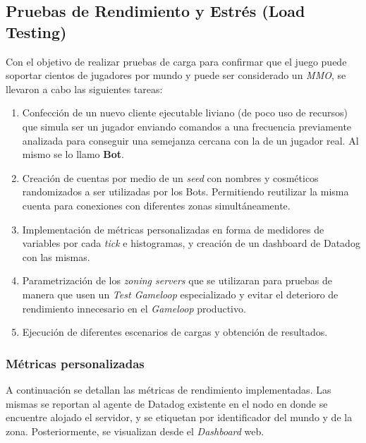 \subsection{Pruebas de Rendimiento y Estrés (Load Testing)}
\label{sec:load-test}

Con el objetivo de realizar pruebas de carga para confirmar que el juego puede soportar cientos de jugadores por mundo
y puede ser considerado un \textit{MMO}, se llevaron a cabo las siguientes tareas:

\begin{enumerate}
    \item Confección de un nuevo cliente ejecutable liviano (de poco uso de recursos) que simula ser un jugador
    enviando comandos a una frecuencia previamente analizada para conseguir una semejanza cercana con la de un jugador real.
    Al mismo se lo llamo \textbf{Bot}.
    \item Creación de cuentas por medio de un \textit{seed} con nombres y cosméticos randomizados a ser utilizadas por los Bots.
    Permitiendo reutilizar la misma cuenta para conexiones con diferentes zonas simultáneamente.
    \item Implementación de métricas personalizadas en forma de medidores de variables por cada \textit{tick} e histogramas, y
    creación de un dashboard de Datadog con las mismas.
    \item Parametrización de los \textit{zoning servers} que se utilizaran para pruebas de manera que usen un \textit{Test Gameloop}
    especializado y evitar el deterioro de rendimiento innecesario en el \textit{Gameloop} productivo.
    \item Ejecución de diferentes escenarios de cargas y obtención de resultados.
\end{enumerate}

\subsubsection{Métricas personalizadas}

A continuación se detallan las métricas de rendimiento implementadas. Las mismas se reportan al agente de Datadog
existente en el nodo en donde se encuentre alojado el servidor, y se etiquetan por identificador del mundo
y de la zona. Posteriormente, se visualizan desde el \textit{Dashboard} web.

